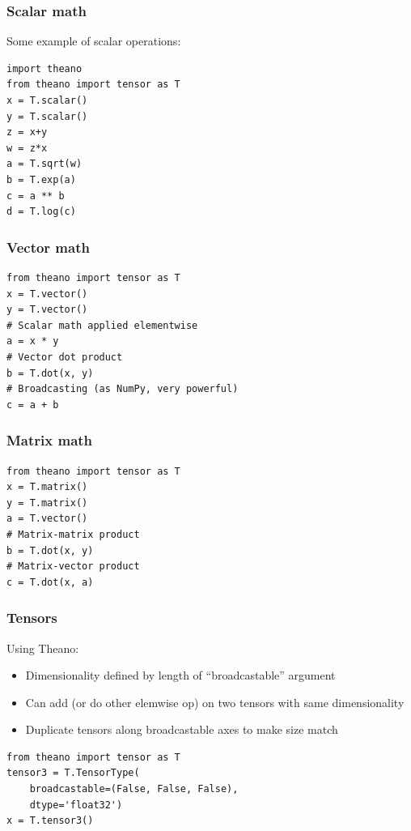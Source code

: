 \documentclass[utf8x,xcolor=pdftex,dvipsnames,table]{beamer}
\begin{document}
\begin{frame}[fragile]
  \frametitle{Scalar math}
Some example of scalar operations:
\begin{lstlisting}
import theano
from theano import tensor as T
x = T.scalar()
y = T.scalar()
z = x+y
w = z*x
a = T.sqrt(w)
b = T.exp(a)
c = a ** b
d = T.log(c)
\end{lstlisting}
\end{frame}

\begin{frame}[fragile]
  \frametitle{Vector math}

\begin{lstlisting}
from theano import tensor as T
x = T.vector()
y = T.vector()
# Scalar math applied elementwise
a = x * y
# Vector dot product
b = T.dot(x, y)
# Broadcasting (as NumPy, very powerful)
c = a + b
\end{lstlisting}
\end{frame}

\begin{frame}[fragile]
  \frametitle{Matrix math}

\begin{lstlisting}
from theano import tensor as T
x = T.matrix()
y = T.matrix()
a = T.vector()
# Matrix-matrix product
b = T.dot(x, y)
# Matrix-vector product
c = T.dot(x, a)
\end{lstlisting}
\end{frame}

\begin{frame}[fragile]
  \frametitle{Tensors}
  Using Theano:
  \begin{itemize}
  \item Dimensionality defined by length of ``broadcastable'' argument
  \item Can add (or do other elemwise op) on two
    tensors with same dimensionality
  \item Duplicate tensors along broadcastable axes to make size match
  \end{itemize}
\begin{lstlisting}
from theano import tensor as T
tensor3 = T.TensorType(
    broadcastable=(False, False, False),
    dtype='float32')
x = T.tensor3()
\end{lstlisting}
\end{frame}
\end{document}
